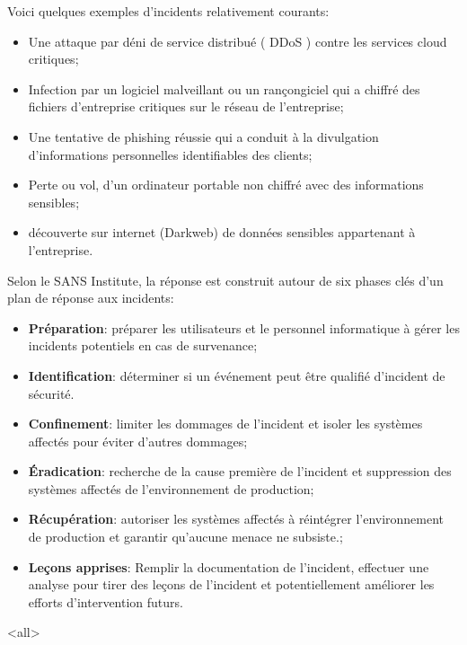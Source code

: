Voici quelques exemples d'incidents relativement courants:

\begin{itemize}
  \item Une attaque par déni de service distribué ( DDoS ) contre les services cloud critiques;
  \item  Infection par un logiciel malveillant ou un rançongiciel qui a chiffré des fichiers d'entreprise critiques sur le réseau de l'entreprise;
  \item Une tentative de phishing réussie qui a conduit à la divulgation d'informations personnelles identifiables des clients;
  \item Perte ou vol, d'un ordinateur portable non chiffré avec des informations sensibles;
  \item découverte sur internet (Darkweb) de données sensibles appartenant à l'entreprise.
\end{itemize}

Selon le SANS Institute, la réponse est construit autour de six phases clés d'un plan de réponse aux incidents:

\begin{itemize}
  \item \textbf{Préparation}: préparer les utilisateurs et le personnel informatique à gérer les incidents potentiels en cas de survenance;
  \item \textbf{Identification}: déterminer si un événement peut être qualifié d'incident de sécurité.
  \item \textbf{Confinement}: limiter les dommages de l'incident et isoler les systèmes affectés pour éviter d'autres dommages;
  \item \textbf{Éradication}: recherche de la cause première de l'incident et suppression des systèmes affectés de l'environnement de production;
  \item \textbf{Récupération}: autoriser les systèmes affectés à réintégrer l'environnement de production et garantir qu'aucune menace ne subsiste.;
  \item \textbf{Leçons apprises}: Remplir la documentation de l'incident, effectuer une analyse pour tirer des leçons de l'incident et potentiellement améliorer les efforts d'intervention futurs.
\end{itemize}

\mode<all>{}

